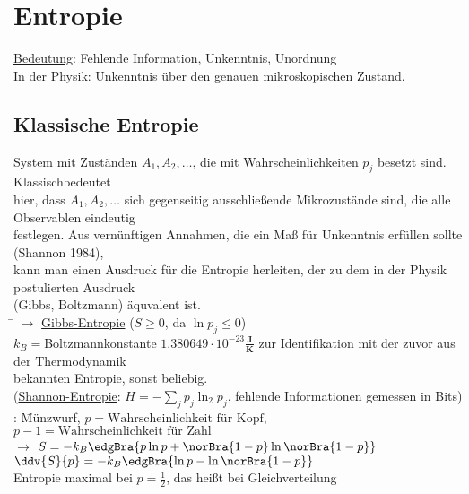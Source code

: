 \section{Entropie}
\begin{tabbing}
\uline{Bedeutung}: Fehlende Information, Unkenntnis, \glqq Unordnung \grqq\\
In der Physik: Unkenntnis über den genauen mikroskopischen Zustand.
\end{tabbing}
\subsection{Klassische Entropie}
\begin{tabbing}
System mit Zuständen $A_1,A_2,\dots$, die mit Wahrscheinlichkeiten $p_j$ besetzt sind. \glqq Klassisch\grqq bedeutet\\ hier, dass $A_1,A_2,\dots$ sich gegenseitig ausschließende Mikrozustände sind, die alle Observablen eindeutig\\ festlegen.
Aus vernünftigen Annahmen, die ein Maß für Unkenntnis erfüllen sollte (Shannon 1984),\\ kann man einen Ausdruck für die Entropie herleiten, der zu dem in der Physik postulierten Ausdruck\\ (Gibbs, Boltzmann) äquvalent ist.\\
\hspace{4em} \= \kill
$\rightarrow$\>  \uline{Gibbs-Entropie} ($S\geq 0$, da $\ln p_j \leq 0$)\\
$k_B =$Boltzmannkonstante $1.380649\cdot 10^{-23}\frac{\textbf{J}}{\textbf{K}}$ zur Identifikation mit der zuvor aus der Thermodynamik\\ bekannten Entropie, sonst beliebig.\\
(\uline{Shannon-Entropie}: $H=-\sum\limits_j p_j \ln_2 p_j$, fehlende Informationen gemessen in Bits)\\
: \=Münzwurf, $p=\text{Wahrscheinlichkeit für Kopf}$, $p-1 = \text{Wahrscheinlichkeit für Zahl}$\\
\>$\rightarrow$ $S=-k_B \edgBra{p\ln p+ \norBra{1-p}\ln\norBra{1-p}}$\\
\>$\ddv{S}{p} = -k_B\edgBra{\ln p - \ln\norBra{1-p}}$\\
Entropie maximal bei $p=\frac12$, das heißt bei Gleichverteilung
\end{tabbing}
\begin{figure}[H]
  \centering
\end{figure}

